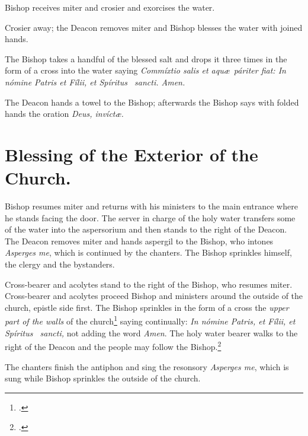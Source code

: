 \documentclass[letterpaper]{report}
\begin{document}
{\rubric Bishop receives miter and crosier and exorcises the water.

\rubric Crosier away; the Deacon removes miter and Bishop blesses the water
with joined hands.

\rubric The Bishop takes a handful of the blessed salt and drops it three times
in the form of a cross into the water saying \textit{Commíxtio salis et aqu\ae\
páriter fiat: In nómine Pa\cross tris et Fí\cross lii, et Spíritus \cross\
sancti. \rbar Amen.}

\rubric The Deacon hands a towel to the Bishop; afterwards the Bishop says with
folded hands the oration \textit{Deus, invíct\ae.}

\section{Blessing of the Exterior of the Church.}

\rubric Bishop resumes miter and returns with his ministers to the main
entrance where he stands facing the door. The server in charge of the holy
water transfers some of the water into the aspersorium and then stands to the
right of the Deacon. The Deacon removes miter and hands aspergil to the Bishop,
who intones \textit{Asperges me}, which is continued by the chanters. The
Bishop sprinkles himself, the clergy and the bystanders.

\rubric Cross-bearer and acolytes stand to the right of the Bishop, who resumes
miter. Cross-bearer and acolytes proceed Bishop and ministers around the
outside of the church, epistle side first. The Bishop sprinkles in the form of
a cross the \textit{upper part of the walls} of the church\footcite[The
procession walks around and Bishop sprinkles the cemetery also if it be
adjacent.][n. 41, p. 44.]{consecranda} saying continually: \textit{In nómine
Pa\cross tris, et Fí\cross lii, et Spíritus \cross\ sancti,} not adding the
word \textit{Amen}. The holy water bearer walks to the right of the Deacon and
the people may follow the Bishop.\footcite[If it is impossible to go around the
church, he sprinkles the wall at his right as far as he can, then, passing by
the front of the church, he goes to the place at the other side of the church
nearest the point at which he stoped on the right side and begins to sprinkle
the walls from that point until he arrives at the main portal.][note 2, p.
44.]{consecranda}

\rubric The chanters finish the antiphon and sing the resonsory
\textit{Asperges me}, which is sung while Bishop sprinkles the outside of the
church.

}
\end{document}
